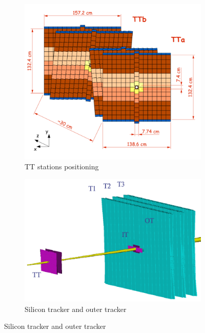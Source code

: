 \begin{figure}[H]
\begin{subfigure}[b]{0.45\textwidth}
  \centering
  \includegraphics[width=\linewidth]{figures/chapter2/TT.png}
  \caption{TT stations positioning \cite{Knecht:1214889}}
  \label{fig:TT}
  \end{subfigure}
\begin{subfigure}[b]{0.45\textwidth}
  \centering
  \includegraphics[width=\linewidth]{figures/chapter2/The-main-tracking-system-of-LHCb-TT-IT-and-OT.png}
  \caption{Silicon tracker and outer tracker \cite{alignment-overview}}
  \label{fig:st_ot}
  \end{subfigure}
\end{figure}

